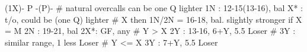 (1X)- P -(P)- 
# natural overcalls can be one Q lighter
1N : 12-15(13-16), bal
X* : t/o, could be (one Q) lighter  
# X then 1N/2N = 16-18, bal. slightly stronger if X = M
2N : 19-21, bal
2X*: GF, any
# Y > X
2Y : 13-16, 6+Y, 5.5 Loser  # 3Y : similar range, 1 less Loser
# Y <= X
3Y : 7+Y, 5.5 Loser
